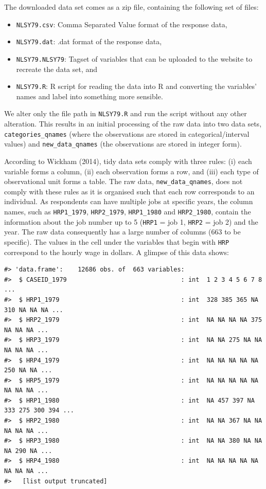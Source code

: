 \documentclass{article}
\begin{document}
The downloaded data set comes as a zip file, containing the following set of files:

\begin{itemize}
\tightlist
\item
  \texttt{NLSY79.csv}: Comma Separated Value format of the response data,
\item
  \texttt{NLSY79.dat}: .dat format of the response data,
\item
  \texttt{NLSY79.NLSY79}: Tagset of variables that can be uploaded to the website to recreate the data set, and
\item
  \texttt{NLSY79.R}: R script for reading the data into R and converting the variables' names and label into something more sensible.
\end{itemize}

We alter only the file path in \texttt{NLSY79.R} and run the script without any other alteration. This results in an initial processing of the raw data into two data sets, \texttt{categories\_qnames} (where the observations are stored in categorical/interval values) and \texttt{new\_data\_qnames} (the observations are stored in integer form).

According to Wickham (2014), tidy data sets comply with three rules: (i) each variable forms a column, (ii) each observation forms a row, and (iii) each type of observational unit forms a table. The raw data, \texttt{new\_data\_qnames}, does not comply with these rules as it is organised such that each row corresponds to an individual. As respondents can have multiple jobs at specific years, the column names, such as \texttt{HRP1\_1979}, \texttt{HRP2\_1979}, \texttt{HRP1\_1980} and \texttt{HRP2\_1980}, contain the information about the job number up to 5 (\texttt{HRP1} = job 1, \texttt{HRP2} = job 2) and the year. The raw data consequently has a large number of columns (663 to be specific). The values in the cell under the variables that begin with \texttt{HRP} correspond to the hourly wage in dollars. A glimpse of this data shows:

\begin{verbatim}
#> 'data.frame':    12686 obs. of  663 variables:
#>  $ CASEID_1979                               : int  1 2 3 4 5 6 7 8 ...
#>  $ HRP1_1979                                 : int  328 385 365 NA 310 NA NA NA ...
#>  $ HRP2_1979                                 : int  NA NA NA NA 375 NA NA NA ...
#>  $ HRP3_1979                                 : int  NA NA 275 NA NA NA NA NA ...
#>  $ HRP4_1979                                 : int  NA NA NA NA NA 250 NA NA ...
#>  $ HRP5_1979                                 : int  NA NA NA NA NA NA NA NA ...
#>  $ HRP1_1980                                 : int  NA 457 397 NA 333 275 300 394 ...
#>  $ HRP2_1980                                 : int  NA NA 367 NA NA NA NA NA ...
#>  $ HRP3_1980                                 : int  NA NA 380 NA NA NA 290 NA ...
#>  $ HRP4_1980                                 : int  NA NA NA NA NA NA NA NA ...
#>   [list output truncated]
\end{verbatim}
\end{document}
